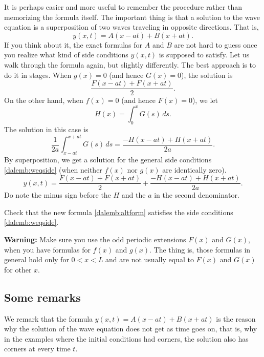 It is perhaps easier and more useful
to remember the procedure rather than memorizing the formula
itself.  The important thing is that a solution to the wave
equation is a superposition of two waves traveling in opposite directions.
That is,
\begin{equation*}
y(x,t) = A(x-at) + B(x+at) .
\end{equation*}
If you think about it, the exact formulas for $A$ and $B$ are not hard
to guess once you realize what kind of side conditions $y(x,t)$ is supposed to
satisfy.  Let us walk through the formula again, but slightly differently.
The best approach is to do it in stages.  When $g(x) = 0$ (and hence
$G(x) = 0$), the solution is
\begin{equation*}
\frac{ F(x-at) + F(x+at) }{2} .
\end{equation*}
On the other hand,
when $f(x) = 0$ (and hence $F(x) = 0$), we let
\begin{equation*}
H(x) = \int_0^x G(s) \,ds .
\end{equation*}
The solution in this case is
\begin{equation*}
\frac{1}{2a} \int_{x-at}^{x+at} G(s) \,ds
=
\frac{ -H(x-at) + H(x+at) }{2a} .
\end{equation*}
By superposition, we get a solution for the general side conditions
\eqref{dalemb:weqside} (when neither $f(x)$ nor $g(x)$ are identically zero).
\begin{equation} \label{dalemb:altform}
y(x,t) = \frac{ F(x-at) + F(x+at) }{2} +
\frac{ -H(x-at) + H(x+at) }{2a} .
\end{equation}
Do note the minus sign before the $H$ and the $a$ in the second denominator.

\begin{exercise}
Check that the new formula \eqref{dalemb:altform} satisfies
the side conditions
\eqref{dalemb:weqside}.
\end{exercise}

\textbf{Warning:}
Make sure you use the odd periodic extensions $F(x)$ and $G(x)$,
when you have formulas for $f(x)$ and $g(x)$.
The thing is, those formulas in general hold
only for $0 < x < L$ and are not usually equal to $F(x)$ and $G(x)$
for other $x$.

\subsection{Some remarks}

We remark that the formula $y(x,t) = A(x-at) + B(x+at)$ is the reason
why the solution of the wave equation does not get  as time
goes on, that is, why in the examples where the initial conditions
had corners, the solution also has corners at every time $t$.

